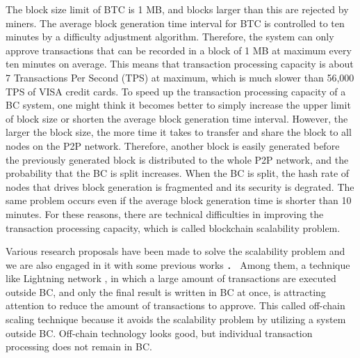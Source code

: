 \documentclass[graybox]{svmult}
\begin{document}
The block size limit of BTC is 1 MB, and blocks larger than this are rejected by miners. 
The average block generation time interval for BTC is controlled to ten minutes by a difficulty adjustment algorithm. 
Therefore, the system can only approve transactions that can be recorded in a block of 1 MB at maximum every ten minutes on average. 
This means that transaction processing capacity is about 7 Transactions Per Second (TPS) at maximum, which is much slower than 56,000 TPS of VISA credit cards. 
To speed up the transaction processing capacity of a BC system, one might think it becomes better to simply increase the upper limit of block size or shorten the average block generation time interval. 
However, the larger the block size, the more time it takes to transfer and share the block to all nodes on the P2P network. 
Therefore, another block is easily generated before the previously generated block is distributed to the whole P2P network, and the probability that the BC is split increases. 
When the BC is split, the hash rate of nodes that drives block generation is fragmented and its security is degrated. 
The same problem occurs even if the average block generation time is shorter than 10 minutes. 
For these reasons, there are technical difficulties in improving the transaction processing capacity, which is called blockchain scalability problem.


Various research proposals have been made to solve the scalability problem \cite{ZHZB2020} and we are also engaged in it with some previous works \cite{Fujihara2018,Fujihara2019,Fujihara2020,YF2021a,YF2021b}．
Among them, a technique like Lightning network \cite{PD2016}, in which a large amount of transactions are executed outside BC, and only the final result is written in BC at once, is attracting attention to reduce the amount of transactions to approve. 
This called off-chain scaling technique because it avoids the scalability problem by utilizing a system outside BC. 
Off-chain technology looks good, but individual transaction processing does not remain in BC.
\end{document}
